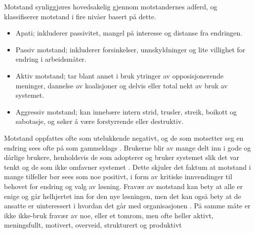 \noindent
Motstand synliggjøres hovedsakelig gjennom motstandernes adferd, og \citet{Lapointe05} klassifiserer motstand i fire nivåer basert på dette.
 
\begin{itemize}
\item Apati; inkluderer passivitet, mangel på interesse og distanse fra endringen.
\item Passiv motstand; inkluderer forsinkelser, unnskyldninger og lite villighet for endring i arbeidsmåter.
\item Aktiv motstand; tar blant annet i bruk ytringer av opposisjonerende meninger, dannelse av koalisjoner og delvis eller total nekt av bruk av systemet.
\item Aggressiv motstand; kan innebære intern strid, trusler, streik, boikott og sabotasje, og søker å være forstyrrende eller destruktiv.
\end{itemize} 
 
\noindent
Motstand oppfattes ofte som utelukkende negativt, og de som motsetter seg en endring sees ofte på som gammeldags \citep{Jacobsen12}. Brukerne blir av mange delt inn i gode og  dårlige brukere, henholdsvis de som adopterer og bruker systemet slik det var tenkt og de som ikke omfavner systemet \citep{Satchell09}. Dette skjuler det faktum at motstand i mange tilfeller bør sees som noe positivt, i form av kritiske innvendinger til behovet for endring og valg av løsning. Fravær av motstand kan bety at alle er enige og går helhjertet inn for den nye løsningen, men det kan også bety at de ansatte er uinteressert i hvordan det går med organisasjonen \citep{Jacobsen12}. På samme måte er ikke ikke-bruk fravær av noe, eller et tomrom, men ofte heller aktivt, meningsfullt, motivert, overveid, strukturert og produktivt \citep{Satchell09}
 
